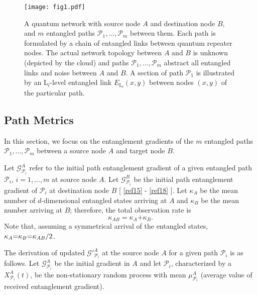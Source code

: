 \documentclass[11pt]{article}%
\newcommand*{\cref}[1]{%
  \begingroup
    \hypersetup{
      linkcolor=linkequation,
      linkbordercolor=linkequation,
    }%
    \ref{#1}%
  \endgroup
}
\begin{document}
\begin{figure*}[h!]
\vspace{-0.6cm}
 \begin{center}
 	 \texttt{[image: fig1.pdf]}

\caption{A quantum network with source node $A$ and destination node $B$, and $m$ entangled paths ${\mathcal{P}}_{\mathrm{1}}\mathrm{,\dots ,}{\mathcal{P}}_m$ between them. Each path is formulated by a chain of entangled links between quantum repeater nodes. The actual network topology between $A$ and $B$ is unknown (depicted by the cloud) and paths ${\mathcal{P}}_{\mathrm{1}}\mathrm{,\dots ,}{\mathcal{P}}_m$ abstract all entangled links and noise between $A$ and $B$. A section of path ${\mathcal{P}}_{\mathrm{1}}$ is illustrated by an ${\mathrm{L}}_l$-level entangled link $E_{{\mathrm{L}}_l}\left(x,y\right)$ between nodes $\left(x,y\right)$ of the particular path.}
 \label{fig1}
\end{center}
\end{figure*}

\subsection{Path Metrics }

 In this section, we focus on the entanglement gradients of the $m$ entangled paths ${\mathcal{P}}_{\mathrm{1}}\mathrm{,\dots ,}{\mathcal{P}}_m$ between a source node $A$ and target node $B$. 

 Let ${\mathcal{G}}^A_{{\mathcal{P}}_i}$ refer to the initial path entanglement gradient of a given entangled path ${\mathcal{P}}_i$, $i\mathrm{=1,\dots ,}m$ at source node $A$. Let ${\mathcal{G}}^B_{{\mathcal{P}}_i}$ be the initial path entanglement gradient of ${\mathcal{P}}_i$ at destination node $B$ [\cref{ref15}-\cref{ref18}]. Let ${\kappa }_A$ be the mean number of $d$-dimensional entangled states arriving at $A$ and ${\kappa }_B$ be the mean number arriving at $B$; therefore, the total observation rate is
\begin{equation} \label{14)} 
{\kappa }_{AB}\mathrm{=}{\kappa }_A\mathrm{+}{\kappa }_B.                                                                                        
\end{equation} 
Note that, assuming a symmetrical arrival of the entangled states, ${\kappa }_A\mathrm{=}{\kappa }_B\\\mathrm{=}{{\kappa }_{AB}}/{\mathrm{2}}$.

 The derivation of updated ${\mathcal{G}}'^A_{{\mathcal{P}}_i}$ at the source node $A$ for a given path ${\mathcal{P}}_i$ is as follows. Let ${\mathcal{G}}^A_{{\mathcal{P}}_i}$ be the initial gradient in $A$ and let ${\mathcal{P}}_i$, characterized by a $X^A_{{\mathcal{P}}_i}\left(t\right)$, be the non-stationary random process with mean ${\mu }^A_{{\mathcal{P}}_i}$ (average value of received entanglement gradient).
\end{document}
